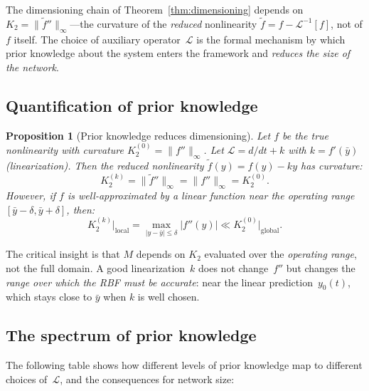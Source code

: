 \documentclass[11pt,a4paper]{article}
\newtheorem{proposition}[theorem]{Proposition}
\begin{document}
The dimensioning chain of Theorem~\ref{thm:dimensioning} depends on $K_2 = \|\tilde{f}''\|_\infty$---the curvature of the \emph{reduced} nonlinearity $\tilde{f} = f - \mathcal{L}^{-1}[f]$, not of $f$ itself. The choice of auxiliary operator~$\mathcal{L}$ is the formal mechanism by which prior knowledge about the system enters the framework and \emph{reduces the size of the network}.

\subsection{Quantification of prior knowledge}

\begin{proposition}[Prior knowledge reduces dimensioning]\label{prop:prior}
Let $f$ be the true nonlinearity with curvature $K_2^{(0)} = \|f''\|_\infty$. Let $\mathcal{L} = d/dt + k$ with $k = f'(\bar{y})$ (linearization). Then the reduced nonlinearity $\tilde{f}(y) = f(y) - ky$ has curvature:
\begin{equation}
K_2^{(k)} = \|\tilde{f}''\|_\infty = \|f''\|_\infty = K_2^{(0)}.
\label{eq:K2-same}
\end{equation}
However, if $f$ is well-approximated by a linear function near the operating range $[\bar{y} - \delta, \bar{y} + \delta]$, then:
\begin{equation}
K_2^{(k)}\big|_{\mathrm{local}} = \max_{|y - \bar{y}| \leq \delta} |f''(y)| \ll K_2^{(0)}\big|_{\mathrm{global}}.
\label{eq:K2-local}
\end{equation}
\end{proposition}

The critical insight is that $M$ depends on $K_2$ evaluated over the \emph{operating range}, not the full domain. A good linearization~$k$ does not change~$f''$ but changes the \emph{range over which the RBF must be accurate}: near the linear prediction~$y_0(t)$, which stays close to $\bar{y}$ when $k$ is well chosen.

\subsection{The spectrum of prior knowledge}

The following table shows how different levels of prior knowledge map to different choices of~$\mathcal{L}$, and the consequences for network size:
\end{document}
